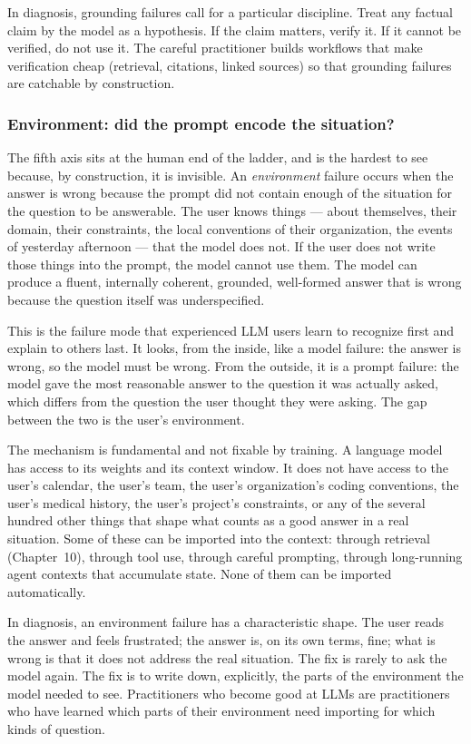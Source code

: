 In diagnosis, grounding failures call for a particular discipline.
Treat any factual claim by the model as a hypothesis. If the claim
matters, verify it. If it cannot be verified, do not use it. The
careful practitioner builds workflows that make verification cheap
(retrieval, citations, linked sources) so that grounding failures
are catchable by construction.

\subsubsection{Environment: did the prompt encode the situation?}

The fifth axis sits at the human end of the ladder, and is the
hardest to see because, by construction, it is invisible. An
\emph{environment} failure occurs when the answer is wrong because
the prompt did not contain enough of the situation for the
question to be answerable. The user knows things --- about
themselves, their domain, their constraints, the local conventions
of their organization, the events of yesterday afternoon --- that
the model does not. If the user does not write those things into
the prompt, the model cannot use them. The model can produce a
fluent, internally coherent, grounded, well-formed answer that is
wrong because the question itself was underspecified.

This is the failure mode that experienced LLM users learn to
recognize first and explain to others last. It looks, from the
inside, like a model failure: the answer is wrong, so the model
must be wrong. From the outside, it is a prompt failure: the
model gave the most reasonable answer to the question it was
actually asked, which differs from the question the user thought
they were asking. The gap between the two is the user's
environment.

The mechanism is fundamental and not fixable by training. A
language model has access to its weights and its context window.
It does not have access to the user's calendar, the user's team,
the user's organization's coding conventions, the user's medical
history, the user's project's constraints, or any of the several
hundred other things that shape what counts as a good answer in a
real situation. Some of these can be imported into the context:
through retrieval (Chapter~10), through tool use, through careful
prompting, through long-running agent contexts that accumulate
state. None of them can be imported automatically.

In diagnosis, an environment failure has a characteristic shape.
The user reads the answer and feels frustrated; the answer is, on
its own terms, fine; what is wrong is that it does not address
the real situation. The fix is rarely to ask the model again. The
fix is to write down, explicitly, the parts of the environment the
model needed to see. Practitioners who become good at LLMs are
practitioners who have learned which parts of their environment
need importing for which kinds of question.

